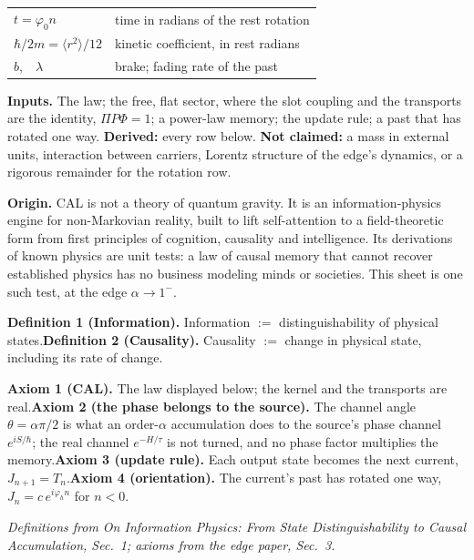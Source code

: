 \documentclass[10pt]{article}
\begin{document}
\begin{sheetbox}
{\begin{minipage}[t]{0.47\linewidth}
\begin{tabular}[t]{@{}l l@{}}
$t=\varphi_0n$ & time in radians of the rest rotation\\
$\hbar/2m=\langle r^2\rangle/12$ & kinetic coefficient, in rest radians\\
$b$,\ \ $\lambda$ & brake; fading rate of the past\\
\bottomrule
\end{tabular}
\end{minipage}}\par\vspace{3pt}
\textbf{Inputs.} The law; the free, flat sector, where the slot coupling and the transports are the identity, $\Pi P\Phi=1$; a power-law memory; the update rule; a past that has rotated one way. \textbf{Derived:} every row below. \textbf{Not claimed:} a mass in external units, interaction between carriers, Lorentz structure of the edge's dynamics, or a rigorous remainder for the rotation row.
\end{sheetbox}

\vspace{2pt}
\begin{sheetbox}
\textbf{Origin.} CAL is not a theory of quantum gravity. It is an information-physics engine for non-Markovian reality, built to lift self-attention to a field-theoretic form from first principles of cognition, causality and intelligence. Its derivations of known physics are unit tests: a law of causal memory that cannot recover established physics has no business modeling minds or societies. This sheet is one such test, at the edge $\alpha\to1^-$.\par\vspace{2pt}
\textbf{Definition 1 (Information).} Information $:=$ distinguishability of physical states.\quad \textbf{Definition 2 (Causality).} Causality $:=$ change in physical state, including its rate of change.\par\vspace{2pt}
\textbf{Axiom 1 (CAL).} The law displayed below; the kernel and the transports are real.\quad \textbf{Axiom 2 (the phase belongs to the source).} The channel angle $\theta=\alpha\pi/2$ is what an order-$\alpha$ accumulation does to the source's phase channel $e^{iS/\hbar}$; the real channel $e^{-H/\tau}$ is not turned, and no phase factor multiplies the memory.\quad \textbf{Axiom 3 (update rule).} Each output state becomes the next current, $J_{n+1}=T_n$.\quad \textbf{Axiom 4 (orientation).} The current's past has rotated one way, $J_n=c\,e^{i\varphi_hn}$ for $n<0$.\par\vspace{2pt}
{\footnotesize\textit{Definitions from On Information Physics: From State Distinguishability to Causal Accumulation, Sec.~1; axioms from the edge paper, Sec.~3.}}
\end{sheetbox}
\end{document}
